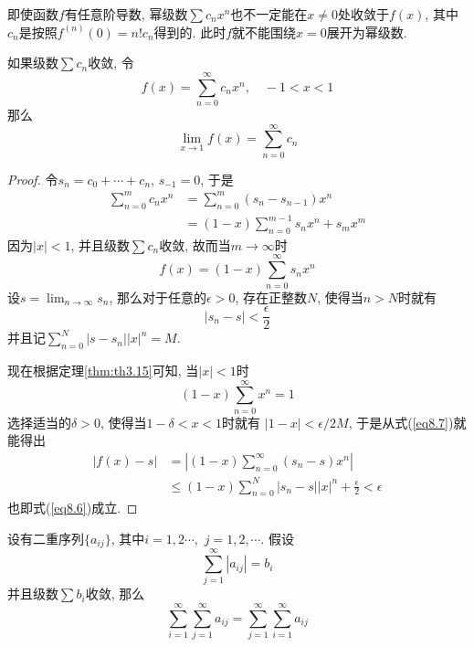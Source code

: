 \documentclass[cn,12pt,math=mtpro2,citestyle=gb7714-2015,bibstyle=gb7714-2015,twocol]{elegantbook}
\newcommand{\limn}{\lim_{n\to\infty}}
\begin{document}
\begin{remark}
即使函数$f$有任意阶导数, 幂级数$\sum c_nx^n$也不一定能在$x\neq 0$处收敛于$f(x)$, 其中$c_n$是按照$f^{(n)}(0)=n!c_n$得到的. 此时$f$就不能围绕$x=0$展开为幂级数.
\end{remark}
\begin{theorem}\label{thm:th8.2}
  如果级数$\sum c_n$收敛, 令
  $$f(x)=\sum_{n=0}^{\infty}c_nx^n, \quad -1<x<1$$
  那么
  \begin{equation}\label{eq8.6}
    \lim_{x\to1}f(x)=\sum_{n=0}^{\infty}c_n
  \end{equation}
\end{theorem}
\begin{proof}
  令$s_n=c_0+\cdots+c_n$, $s_{-1}=0$, 于是
  \begin{align*}
  \sum_{n=0}^{m}c_nx^n&=\sum_{n=0}^{m}(s_n-s_{n-1})x^n \\
  &=(1-x)\sum_{n=0}^{m-1}s_nx^n+s_mx^m
  \end{align*}
  因为$|x|<1$, 并且级数$\sum c_n$收敛, 故而当$m\to\infty$时
  \begin{equation}\label{eq8.7}
    f(x)=(1-x)\sum_{n=0}^{\infty}s_nx^n
  \end{equation}
 设$s=\limn s_n$, 那么对于任意的$\epsilon>0$, 存在正整数$N$, 使得当$n>N$时就有
  $$|s_n-s|<\frac{\epsilon}{2}$$
  并且记$\sum_{n=0}^{N}|s-s_n||x|^n=M$.

  现在根据定理\ref{thm:th3.15}可知, 当$|x|<1$时
  $$(1-x)\sum_{n=0}^{\infty}x^n=1$$
  选择适当的$\delta>0$, 使得当$1-\delta<x<1$时就有
  $\displaystyle |1-x|< \epsilon/2M$, 于是从式(\ref{eq8.7})就能得出
  \begin{align*}
  |f(x)-s|&=\left|(1-x)\sum_{n=0}^{\infty}(s_n-s)x^n\right| \\
  &\leq(1-x)\sum_{n=0}^{N}|s_n-s||x|^n+\frac{\epsilon}{2}<\epsilon
  \end{align*}
  也即式(\ref{eq8.6})成立.
\end{proof}
\begin{theorem}\label{thm:th8.3}
  设有二重序列$\{a_{ij}\}$, 其中$i=1,2\cdots,$ $j=1,2,\cdots$. 假设
  \begin{equation}\label{eq8.8}
    \sum_{j=1}^{\infty}|a_{ij}|=b_i
  \end{equation}
  并且级数$\sum b_i$收敛, 那么
  $$\sum_{i=1}^{\infty}\sum_{j=1}^{\infty}a_{ij}=\sum_{j=1}^{\infty}\sum_{i=1}^{\infty}a_{ij}$$
\end{theorem}
\end{document}
